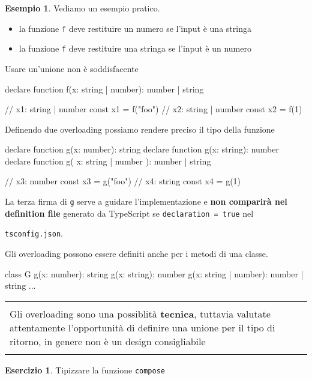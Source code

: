 \documentclass[12pt]{article}
\theoremstyle{definition}
\newtheorem{example}{Esempio}[subsection]
\newtheorem{exercise}{Esercizio}[subsection]
\newenvironment{boxed}
    {\begin{center}
    \begin{tabular}{|p{0.9\textwidth}|}
    \hline\\
    }
    {
    \\\\\hline
    \end{tabular}
    \end{center}
    }
\newenvironment{code}
  {\vspace{0.5cm} \VerbatimEnvironment\begin{typescriptcode}}
  {\end{typescriptcode} \vspace{0.2cm}}
\begin{document}
\begin{example}
Vediamo un esempio pratico.

\begin{itemize}
  \item la funzione \texttt{f} deve restituire un numero se l'input è una stringa
  \item la funzione \texttt{f} deve restituire una stringa se l'input è un numero
\end{itemize}

Usare un'unione non è soddisfacente

\begin{code}
declare function f(x: string | number): number | string

// x1: string | number
const x1 = f("foo")
// x2: string | number
const x2 = f(1)
\end{code}

Definendo due overloading possiamo rendere preciso il tipo della funzione

\begin{code}
declare function g(x: number): string
declare function g(x: string): number
declare function g(
  x: string | number
): number | string

// x3: number
const x3 = g("foo")
// x4: string
const x4 = g(1)
\end{code}

La terza firma di \texttt{g} serve a guidare l'implementazione e \textbf{non comparirà nel definition file}
generato da TypeScript se \texttt{declaration = true} nel

\texttt{tsconfig.json}.

Gli overloading possono essere definiti anche per i metodi di una classe.

\begin{code}
class G {
  g(x: number): string
  g(x: string): number
  g(x: string | number): number | string {
    ...
  }
}
\end{code}

\begin{boxed}
Gli overloading sono una possiblità \textbf{tecnica}, tuttavia valutate attentamente l'opportunità di definire una unione
per il tipo di ritorno, in genere non è un design consigliabile
\end{boxed}

\begin{exercise}
Tipizzare la funzione \texttt{compose}
\end{exercise}

\end{example}
\end{document}
